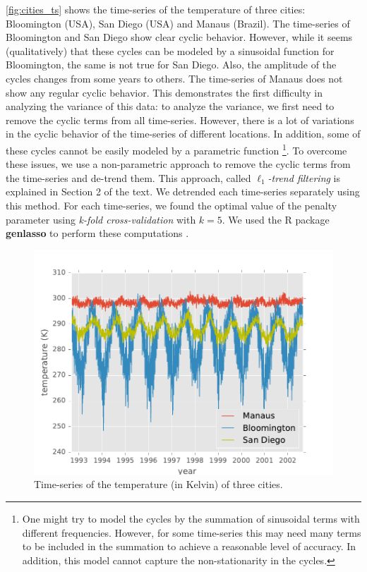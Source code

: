 \documentclass{article}
\begin{document}
\autoref{fig:cities_ts} shows the time-series of the temperature of three cities: Bloomington (USA), San Diego (USA) and Manaus (Brazil). The time-series of Bloomington and San Diego show clear cyclic behavior. However, while it seems (qualitatively) that these cycles can be modeled by a sinusoidal function for Bloomington, the same is not true for San Diego. Also, the amplitude of the cycles changes from some years to others. The time-series of Manaus does not show any regular cyclic behavior. This demonstrates the first difficulty in analyzing the variance of this data: to analyze the variance, we first need to remove the cyclic terms from all time-series. However, there is a lot of variations in the cyclic behavior of the time-series of different locations. In addition, some of these cycles cannot be easily modeled by a parametric function \footnote{One might try to model the cycles by the summation of sinusoidal terms with different frequencies. However, for some time-series this may need many terms to be included in the summation to achieve a reasonable level of accuracy. In addition, this model cannot capture the non-stationarity in the cycles.}. To overcome these issues, we use a non-parametric approach to remove the cyclic terms from the time-series and de-trend them. This approach, called \textit{$\ell_1$-trend filtering} is explained in Section 2 of the text. We detrended each time-series separately using this method. For each time-series, we found the optimal value of the penalty parameter using \textit{k-fold cross-validation} with $k=5$. We used the R package \textbf{genlasso} to perform these computations \cite{arnold_efficient_2016}. 

\begin{figure}[tb]
	\centering
	\includegraphics[width=.2\textheight]{Figures/cities_ts}
 	\caption{Time-series of the temperature (in Kelvin) of three cities.}
 	\label{fig:cities_ts}
\end{figure} 
\end{document}
